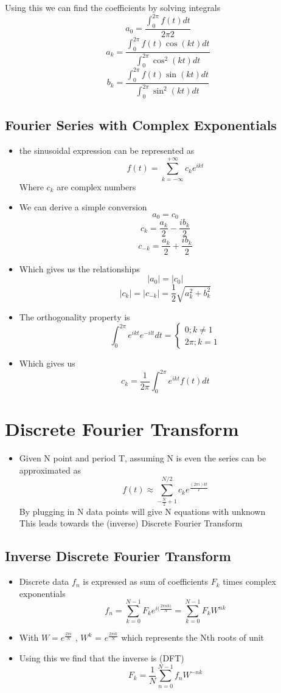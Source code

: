 \documentclass[twoside]{article}
\begin{document}
Using this we can find the coefficients by solving integrals
$$ a_0 = \frac{\int_0^{2\pi} f(t) dt }{2 \pi 2}$$
$$ a_k = \frac{\int_0^{2\pi} f(t) \cos(kt) dt}{\int_0^{2\pi}  \cos^2 (kt) dt}
$$
$$b_k = \frac{\int_0^{2\pi} f(t) \sin(kt) dt}{\int_0^{2\pi}  \sin^2 (kt) dt}$$

\subsection{Fourier Series with Complex Exponentials}
\begin{itemize}
\item the sinusoidal expression can be represented as 
$$ f(t) = \sum_{k = -\infty}^{+\infty} c_k e^{ikt} $$
Where \(c_k\) are complex numbers
\item We can derive a simple conversion 
$$ a_0 = c_0 $$
$$ c_k = \frac{a_k}{2} - \frac{i b_k}{2} $$
$$ c_{-k} = \frac{a_k}{2} + \frac{ib_k}{2} $$
\item Which gives us the relationships 
$$ | a_0 | = |c_0| $$
$$ | c_k | =  |c_{-k}| = \frac{1}{2} \sqrt{a^2_k + b^2_k}$$
\item The orthogonality property is 
$$ \int_0^{2\pi}  e^{ikt} e^{-ilt} dt = \begin{cases}
0; k \neq 1\\ 2 \pi;  k = 1\end{cases} $$
\item Which gives us 
$$ c_k = \frac{1}{2\pi} \int_0^{2\pi} e^{ikt} f(t) dt$$
\end{itemize}

\section{Discrete Fourier Transform}
\begin{itemize}
\item Given N point and period T, assuming N is even the series can be approximated as
$$ f(t) \approx \sum^{N/2}_{-\frac{N}{2} + 1}  c_k e^{\frac{(2 \pi i ) k t}{T}} $$
By plugging in N data points will give N equations with unknown \\
This leads towards the (inverse) Discrete Fourier Transform 
\end{itemize}

\subsection{Inverse Discrete Fourier Transform}
\begin{itemize}
\item Discrete data \(f_n\) is expressed as sum of coefficients \(F_k\) times complex exponentials
$$ f_n = \sum_{k=0}^{N-1} F_k e^{i (\frac{2\pi n k )}{N}} = \sum_{k=0}^{N-1} F_k W^{nk} $$
\item With \(W = e^{\frac{2\pi i }{N}} \) , \(W^k\) = \( e^{\frac{2\pi i k}{N}} \)  which represents the Nth roots of unit
\item Using this we find that the inverse is (DFT) 
$$ F_k = \frac{1}{N} \sum_{n=0}^{N-1} f_n W^{-nk} $$
\end{itemize}
\end{document}
